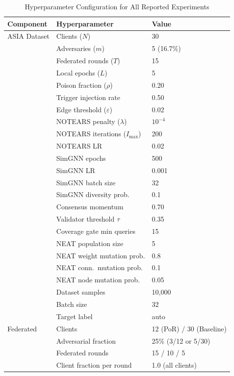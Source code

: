 \documentclass[journal]{IEEEtran}
\newcommand{\notears}{\textsc{NOTEARS}}
\begin{document}
\begin{table}[!tp]
\centering
\footnotesize
\caption{Hyperparameter Configuration for All Reported Experiments}
\label{tab:hyperparams}
\begin{tabular}{lll}
\hline
\textbf{Component} & \textbf{Hyperparameter} & \textbf{Value} \\
\hline
ASIA Dataset & Clients ($N$) & 30 \\
 & Adversaries ($m$) & 5 (16.7\%) \\
 & Federated rounds ($T$) & 15 \\
 & Local epochs ($L$) & 5 \\
 & Poison fraction ($\rho$) & 0.20 \\
 & Trigger injection rate & 0.50 \\
 & Edge threshold ($\varepsilon$) & 0.02 \\
 & \notears{} penalty ($\lambda$) & $10^{-4}$ \\
 & \notears{} iterations ($I_{\max}$) & 200 \\
 & \notears{} LR & 0.02 \\
 & SimGNN epochs & 500 \\
 & SimGNN LR & 0.001 \\
 & SimGNN batch size & 32 \\
 & SimGNN diversity prob. & 0.1 \\
 & Consensus momentum & 0.70 \\
 & Validator threshold $\tau$ & 0.35 \\
 & Coverage gate min queries & 15 \\
 & NEAT population size & 5 \\
 & NEAT weight mutation prob. & 0.8 \\
 & NEAT conn.\ mutation prob. & 0.1 \\
 & NEAT node mutation prob. & 0.05 \\
 & Dataset samples & 10{,}000 \\
 & Batch size & 32 \\
 & Target label & auto \\
\hline
Federated & Clients & 12 (PoR) / 30 (Baseline) \\
 & Adversarial fraction & 25\% (3/12 or 5/30) \\
 & Federated rounds & 15 / 10 / 5 \\
 & Client fraction per round & 1.0 (all clients) \\

\end{tabular}
\end{table}
\end{document}
